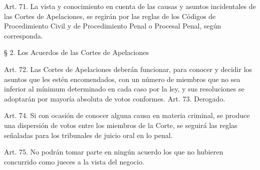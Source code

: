     Art. 71. La vista y conocimiento en cuenta de las causas y asuntos incidentales de las Cortes de Apelaciones, se regirán por las reglas de los Códigos de Procedimiento Civil y de Procedimiento Penal o Procesal Penal, según corresponda.




    § 2. Los Acuerdos de las Cortes de Apelaciones


    Art. 72. Las Cortes de Apelaciones deberán funcionar, para conocer y decidir los asuntos que les estén encomendados, con un número de miembros que no sea inferior al mínimum determinado en cada caso por la ley, y sus resoluciones se adoptarán por mayoría absoluta de votos conformes.
    Art. 73. Derogado.



    Art. 74. Si con ocasión de conocer alguna causa en materia criminal, se produce una dispersión de votos entre los miembros de la Corte, se seguirá las reglas señaladas para los tribunales de juicio oral en lo penal.


    Art. 75. No podrán tomar parte en ningún acuerdo los que no hubieren concurrido como jueces a la vista del negocio.